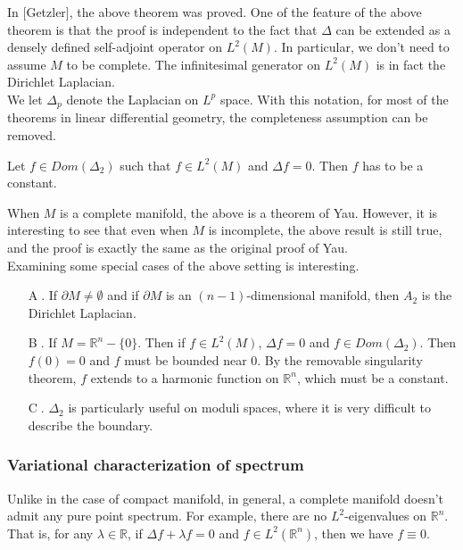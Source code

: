 In [Getzler], the above theorem was proved. One of the feature of the above
theorem is that the proof is independent to the fact that $\Delta$ can be
extended as a densely defined self-adjoint operator on $L^2(M)$. In particular,
we don't need to assume $M$ to be complete. The infinitesimal generator on
$L^2(M)$ is in fact the Dirichlet Laplacian.
\\

We let $\Delta_p$ denote the Laplacian on $L^p$ space. With this notation, for
most of the theorems in linear differential geometry, the completeness 
assumption can be removed.

\begin{example}
Let $f\in Dom(\Delta_2)$ such that $f\in L^2(M)$ and $\Delta f = 0$. Then $f$
has to be a constant.
\end{example}

When $M$ is a complete manifold, the above is a theorem of Yau. However, it is
interesting to see that even when $M$ is incomplete, the above result is still
true, and the proof is exactly the same as the original proof of Yau.
\\

Examining some special cases of the above setting is interesting.
\begin{itemize}
\item[\textcircled{A}.] If $\partial M\neq \emptyset$ and if $\partial M$ is an
$(n-1)$-dimensional manifold, then $A_2$ is the Dirichlet Laplacian.
\item[\textcircled{B}.] If $M = \mathbb{R}^n - \{0\}$. Then if $f\in L^2(M)$, 
$\Delta f = 0$ and $f \in Dom(\Delta_2)$. Then $f(0) = 0$ and $f$ must be
bounded near $0$. By the removable singularity theorem, $f$ extends to a 
harmonic function on $\mathbb{R}^n$, which must be a constant.
\item[\textcircled{C}.] $\Delta_2$ is particularly useful on moduli spaces,
where it is very difficult to describe the boundary.
\end{itemize}

\subsubsection{Variational characterization of spectrum}

Unlike in the case of compact manifold, in general, a complete manifold doesn't
admit any pure point spectrum. For example, there are no $L^2$-eigenvalues on
$\mathbb{R}^n$. That is, for any $\lambda\in\mathbb{R}$, if 
$\Delta f + \lambda f = 0$ and $f \in L^2(\mathbb{R}^n)$, then we have 
$f\equiv 0$.
\\


